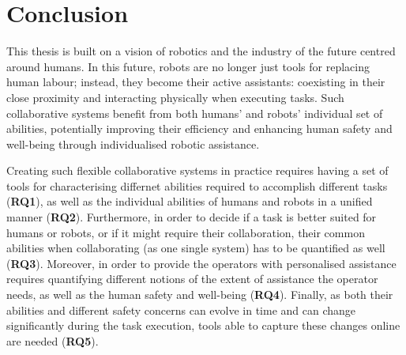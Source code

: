 \chapter{Conclusion}
\label{ch:thesis_conclusion}

This thesis is built on a vision of robotics and the industry of the future centred around humans. In this future, robots are no longer just tools for replacing human labour; instead, they become their active assistants: coexisting in their close proximity and interacting physically when executing tasks. Such collaborative systems benefit from both humans' and robots' individual set of abilities, potentially improving their efficiency and enhancing human safety and well-being through individualised robotic assistance. 




Creating such flexible collaborative systems in practice requires having a set of tools for characterising differnet abilities required to accomplish different tasks (\textbf{RQ1}), as well as the individual abilities of humans and robots in a unified manner (\textbf{RQ2}). Furthermore, in order to decide if a task is better suited for humans or robots, or if it might require their collaboration, their common abilities when collaborating (as one single system) has to be quantified as well (\textbf{RQ3}). Moreover, in order to provide the operators with personalised assistance requires quantifying different notions of the extent of assistance the operator needs, as well as the human safety and well-being (\textbf{RQ4}). Finally, as both their abilities and different safety concerns can evolve in time and can change significantly during the task execution, tools able to capture these changes online are needed (\textbf{RQ5}). 


